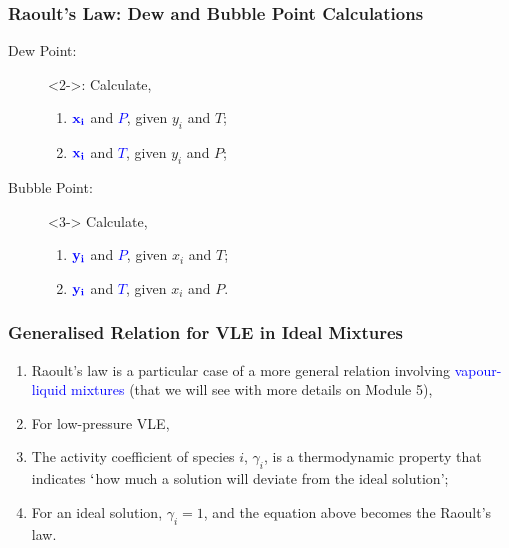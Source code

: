 \documentclass[10pt,compress,unknownkeysallowed]{beamer}
\begin{document}
\begin{frame}
  \frametitle{Raoult's Law: Dew and Bubble Point Calculations}
  \begin{description}
      \item[Dew Point:]<2->: Calculate, 
           \begin{enumerate}
               \item<2-> $\textcolor{blue}{\bf x_{i}}$ and \textcolor{blue}{$P$}, given $y_{i}$ and $T$;
               \item<2-> $\textcolor{blue}{\bf x_{i}}$ and \textcolor{blue}{$T$}, given $y_{i}$ and $P$;
           \end{enumerate}
      \item[Bubble Point:]<3-> Calculate, 
           \begin{enumerate}
               \item<3-> $\textcolor{blue}{\bf y_{i}}$ and \textcolor{blue}{$P$}, given $x_{i}$ and $T$;
               \item<3-> $\textcolor{blue}{\bf y_{i}}$ and \textcolor{blue}{$T$}, given $x_{i}$ and $P$.
           \end{enumerate}
  \end{description}
\end{frame}

\begin{frame}
  \frametitle{Generalised Relation for VLE in Ideal Mixtures}
  \begin{enumerate}
      \item<1-> Raoult's law is a particular case of a more general relation involving \textcolor{blue}{vapour-liquid mixtures} (that we will see with more details on Module 5),
      \item<3-> For low-pressure VLE,
      \item<4-> The activity  coefficient of species $i$, $\gamma_{i}$, is a thermodynamic property that indicates $\lq$how much a solution will deviate from the ideal solution';
      \item<4-> For an ideal solution, $\gamma_{i}=1$, and the equation above becomes the Raoult's law.  
  \end{enumerate}
\end{frame}
\end{document}

